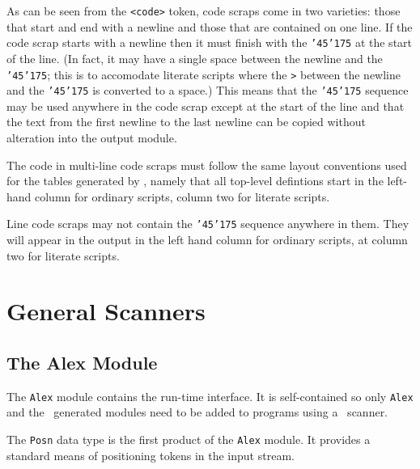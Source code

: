 As can be seen from the \mbox{\tt <code>} token, code scraps come in two varieties:
those that start and end with a newline and those that are contained on one
line.  If the code scrap starts with a newline then it must finish with the
\mbox{\tt {\char'45}{\char'175}} at the start of the line.  (In fact, it may have a single space between
the newline and the \mbox{\tt {\char'45}{\char'175}}; this is to accomodate literate scripts where the \mbox{\tt >}
between the newline and the \mbox{\tt {\char'45}{\char'175}} is converted to a space.)  This means that the
\mbox{\tt {\char'45}{\char'175}} sequence may be used anywhere in the code scrap except at the start of the
line and that the text from the first newline to the last newline can be copied
without alteration into the output module.

The code in multi-line code scraps must follow the same layout conventions used
for the tables generated by \lx, namely that all top-level defintions start in
the left-hand column for ordinary scripts, column two for literate scripts.

Line code scraps may not contain the \mbox{\tt {\char'45}{\char'175}} sequence anywhere in them.  They will
appear in the output in the left hand column for ordinary scripts, at column
two for literate scripts.


\section{General Scanners}
\label{sec-general-scanners}

\subsection{The Alex Module}

The \mbox{\tt Alex} module contains the run-time interface.  It is self-contained so
only \mbox{\tt Alex} and the \lx\ generated modules need to be added to programs using a
\lx\ scanner.

The \mbox{\tt Posn} data type is the first product of the \mbox{\tt Alex} module.  It provides a
standard means of positioning tokens in the input stream.


